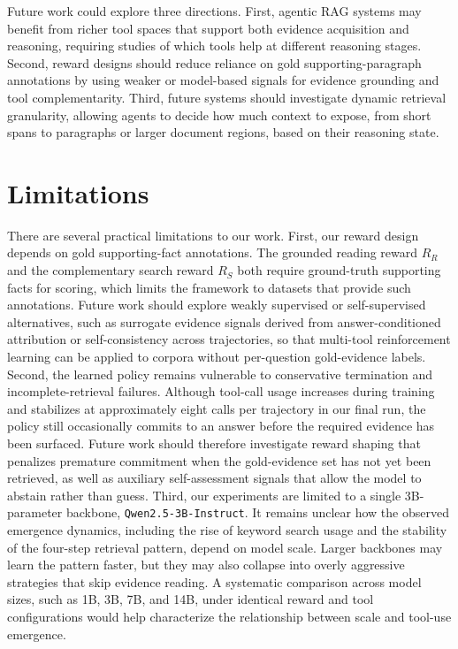 \documentclass[11pt]{article}
\begin{document}
Future work could explore three directions. First, agentic RAG systems may benefit from richer tool spaces that support both evidence acquisition and reasoning, requiring studies of which tools help at different reasoning stages. Second, reward designs should reduce reliance on gold supporting-paragraph annotations by using weaker or model-based signals for evidence grounding and tool complementarity. Third, future systems should investigate dynamic retrieval granularity, allowing agents to decide how much context to expose, from short spans to paragraphs or larger document regions, based on their reasoning state.

\clearpage
\section*{Limitations}
There are several practical limitations to our work. First, our reward design depends on gold supporting-fact annotations. The grounded reading reward $R_R$ and the complementary search reward $R_S$ both require ground-truth supporting facts for scoring, which limits the framework to datasets that provide such annotations. Future work should explore weakly supervised or self-supervised alternatives, such as surrogate evidence signals derived from answer-conditioned attribution or self-consistency across trajectories, so that multi-tool reinforcement learning can be applied to corpora without per-question gold-evidence labels.
%
Second, the learned policy remains vulnerable to conservative termination and incomplete-retrieval failures. Although tool-call usage increases during training and stabilizes at approximately eight calls per trajectory in our final run, the policy still occasionally commits to an answer before the required evidence has been surfaced. Future work should therefore investigate reward shaping that penalizes premature commitment when the gold-evidence set has not yet been retrieved, as well as auxiliary self-assessment signals that allow the model to abstain rather than guess. Third, our experiments are limited to a single 3B-parameter backbone, \texttt{Qwen2.5-3B-Instruct}. It remains unclear how the observed emergence dynamics, including the rise of keyword search usage and the stability of the four-step retrieval pattern, depend on model scale. Larger backbones may learn the pattern faster, but they may also collapse into overly aggressive strategies that skip evidence reading. A systematic comparison across model sizes, such as 1B, 3B, 7B, and 14B, under identical reward and tool configurations would help characterize the relationship between scale and tool-use emergence.
\end{document}
